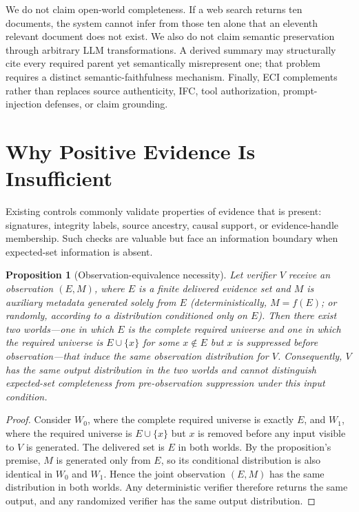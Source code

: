 \documentclass[journal,compsoc]{IEEEtran}
\newtheorem{proposition}{Proposition}
\begin{document}
We do not claim open-world completeness. If a web search returns ten documents, the system cannot infer from those ten alone that an eleventh relevant document does not exist. We also do not claim semantic preservation through arbitrary LLM transformations. A derived summary may structurally cite every required parent yet semantically misrepresent one; that problem requires a distinct semantic-faithfulness mechanism. Finally, ECI complements rather than replaces source authenticity, IFC, tool authorization, prompt-injection defenses, or claim grounding.

\section{Why Positive Evidence Is Insufficient}
Existing controls commonly validate properties of evidence that is present: signatures, integrity labels, source ancestry, causal support, or evidence-handle membership. Such checks are valuable but face an information boundary when expected-set information is absent.

\begin{proposition}[Observation-equivalence necessity]
Let verifier $V$ receive an observation $(E,M)$, where $E$ is a finite delivered evidence set and $M$ is auxiliary metadata generated solely from $E$ (deterministically, $M=f(E)$; or randomly, according to a distribution conditioned only on $E$). Then there exist two worlds---one in which $E$ is the complete required universe and one in which the required universe is $E\cup\{x\}$ for some $x\notin E$ but $x$ is suppressed before observation---that induce the same observation distribution for $V$. Consequently, $V$ has the same output distribution in the two worlds and cannot distinguish expected-set completeness from pre-observation suppression under this input condition.
\end{proposition}
\begin{proof}
Consider $W_0$, where the complete required universe is exactly $E$, and $W_1$, where the required universe is $E\cup\{x\}$ but $x$ is removed before any input visible to $V$ is generated. The delivered set is $E$ in both worlds. By the proposition's premise, $M$ is generated only from $E$, so its conditional distribution is also identical in $W_0$ and $W_1$. Hence the joint observation $(E,M)$ has the same distribution in both worlds. Any deterministic verifier therefore returns the same output, and any randomized verifier has the same output distribution.
\end{proof}
\end{document}
